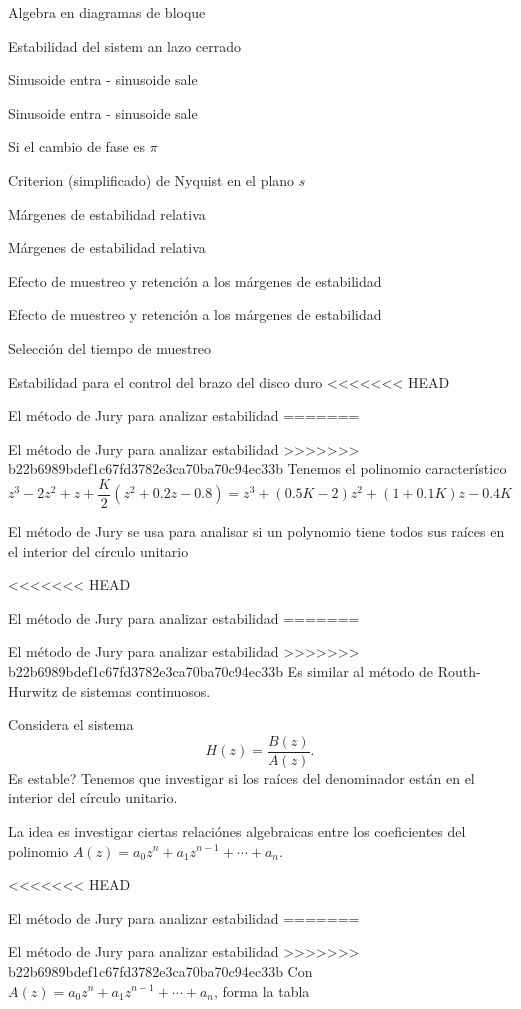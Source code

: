 \documentclass[presentation,aspectratio=169]{beamer}
\begin{document}
\begin{frame}[label={sec:org8e8e439}]{Algebra en diagramas de bloque}
\begin{frame}[label={sec:org5218f19}]{Estabilidad del sistem an lazo cerrado}
\begin{frame}[label={sec:org4ce2307}]{Sinusoide entra - sinusoide sale}
\begin{frame}[label={sec:orgc598966}]{Sinusoide entra - sinusoide sale}
\begin{frame}[label={sec:orgbd54147}]{Si el cambio de fase es \(\pi\)}
\begin{frame}[label={sec:orgf06388b}]{Criterion (simplificado) de Nyquist en el plano \(s\)}
\begin{frame}[label={sec:org5967884}]{Márgenes de estabilidad relativa}
\begin{frame}[label={sec:orgb5ba0e3}]{Márgenes de estabilidad relativa}
\begin{frame}[label={sec:orga8344a9}]{Efecto de muestreo y retención a los márgenes de estabilidad}
\begin{frame}[label={sec:org5e3653d}]{Efecto de muestreo y retención a los márgenes de estabilidad}
\begin{frame}[label={sec:orgd9a9d5d}]{Selección del tiempo de muestreo}
\begin{frame}[label={sec:org2cdebfb}]{Estabilidad para el control del brazo del disco duro}
<<<<<<< HEAD
\begin{frame}[label={sec:org6242817}]{El método de Jury para analizar estabilidad}
=======
\begin{frame}[label={sec:org66e29d2}]{El método de Jury para analizar estabilidad}
>>>>>>> b22b6989bdef1c67fd3782e3ca70ba70c94ec33b
Tenemos el polinomio característico
\[z^3 - 2z^2 + z + \frac{K}{2}(z^2 + 0.2z - 0.8)= z^3 + (0.5K-2)z^2 + (1+0.1K)z - 0.4K\]

\alert{El método de Jury se usa para analisar si un polynomio tiene todos sus raíces en el interior del círculo unitario}
\end{frame}

<<<<<<< HEAD
\begin{frame}[label={sec:org7c040d1}]{El método de Jury para analizar estabilidad}
=======
\begin{frame}[label={sec:orga93ddb5}]{El método de Jury para analizar estabilidad}
>>>>>>> b22b6989bdef1c67fd3782e3ca70ba70c94ec33b
Es similar al método de Routh-Hurwitz de sistemas continuosos.

Considera el sistema
\[ H(z) = \frac{B(z)}{A(z)}. \] Es estable? Tenemos que investigar si los raíces del denominador están en el interior del círculo unitario.

La idea es investigar ciertas relaciónes algebraicas entre los coeficientes del polinomio \(A(z) = a_0z^n + a_1z^{n-1} + \cdots + a_n\).
\end{frame}

<<<<<<< HEAD
\begin{frame}[label={sec:org85b11cd}]{El método de Jury para analizar estabilidad}
=======
\begin{frame}[label={sec:org7fceb23}]{El método de Jury para analizar estabilidad}
>>>>>>> b22b6989bdef1c67fd3782e3ca70ba70c94ec33b
Con \(A(z) = a_0z^n + a_1z^{n-1} + \cdots + a_n\), forma la tabla


\end{frame}
\end{frame}
\end{frame}
\end{frame}
\end{frame}
\end{frame}
\end{frame}
\end{frame}
\end{frame}
\end{frame}
\end{frame}
\end{frame}
\end{frame}
\end{frame}
\end{frame}
\end{frame}
\end{document}
